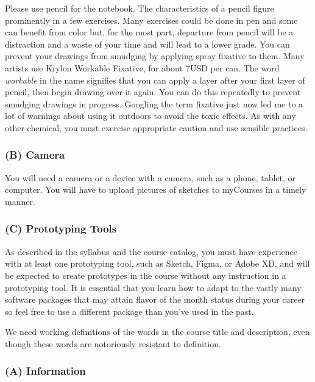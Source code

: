Please use pencil for the notebook. The characteristics of a pencil
figure prominently in a few exercises. Many exercises could be done in
pen and some can benefit from color but, for the most part, departure
from pencil will be a distraction and a waste of your time and will lead
to a lower grade. You can prevent your drawings from smudging by
applying spray fixative to them. Many artists use Krylon Workable
Fixative, for about 7USD per can. The word \emph{workable} in the name
signifies that you can apply a layer after your first layer of pencil,
then begin drawing over it again. You can do this repeatedly to prevent
smudging drawings in progress. Googling the term fixative just now led
me to a lot of warnings about using it outdoors to avoid the toxic
effects. As with any other chemical, you must exercise appropriate
caution and use sensible practices.

\hypertarget{b-camera}{%
\subsubsection{(B) Camera}\label{b-camera}}

You will need a camera or a device with a camera, such as a phone,
tablet, or computer. You will have to upload pictures of sketches to
myCourses in a timely manner.

\hypertarget{c-prototyping-tools}{%
\subsubsection{(C) Prototyping Tools}\label{c-prototyping-tools}}

As described in the syllabus and the course catalog, you must have
experience with at least one prototyping tool, such as Sketch, Figma, or
Adobe XD, and will be expected to create prototypes in the course
without any instruction in a prototyping tool. It is essential that you
learn how to adapt to the vastly many software packages that may attain
flavor of the month status during your career so feel free to use a
different package than you've used in the past.

\hypertarget{definitions}{%
\label{definitions}}

We need working definitions of the words in the course title and
description, even though these words are notoriously resistant to
definition.

\hypertarget{a-information}{%
\subsubsection{(A) Information}\label{a-information}}

